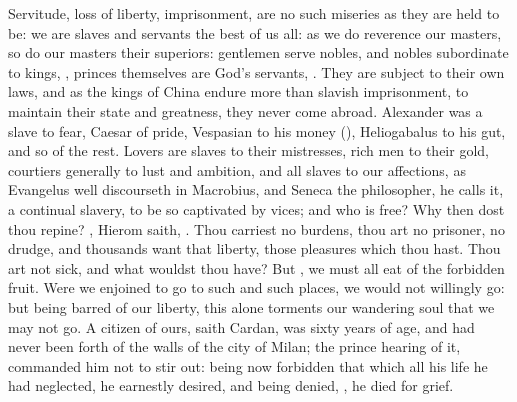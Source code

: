 {Servitude, loss of liberty, imprisonment, are no such miseries as they are held to be: we are slaves and servants the best of us all: as we do reverence our masters, so do our masters their superiors: gentlemen serve nobles, and nobles subordinate to kings, , princes themselves are God's servants, . They are subject to their own laws, and as the kings of China endure more than slavish imprisonment, to maintain their state and greatness, they never come abroad. Alexander was a slave to fear, Caesar of pride, Vespasian to his money (), Heliogabalus to his gut, and so of the rest. Lovers are slaves to their mistresses, rich men to their gold, courtiers generally to lust and ambition, and all slaves to our affections, as Evangelus well discourseth in Macrobius, and Seneca the philosopher,  he calls it, a continual slavery, to be so captivated by vices; and who is free? Why then dost thou repine? , Hierom saith, . Thou carriest no burdens, thou art no prisoner, no drudge, and thousands want that liberty, those pleasures which thou hast. Thou art not sick, and what wouldst thou have? But , we must all eat of the forbidden fruit. Were we enjoined to go to such and such places, we would not willingly go: but being barred of our liberty, this alone torments our wandering soul that we may not go. A citizen of ours, saith Cardan, was sixty years of age, and had never been forth of the walls of the city of Milan; the prince hearing of it, commanded him not to stir out: being now forbidden that which all his life he had neglected, he earnestly desired, and being denied, , he died for grief.

}

